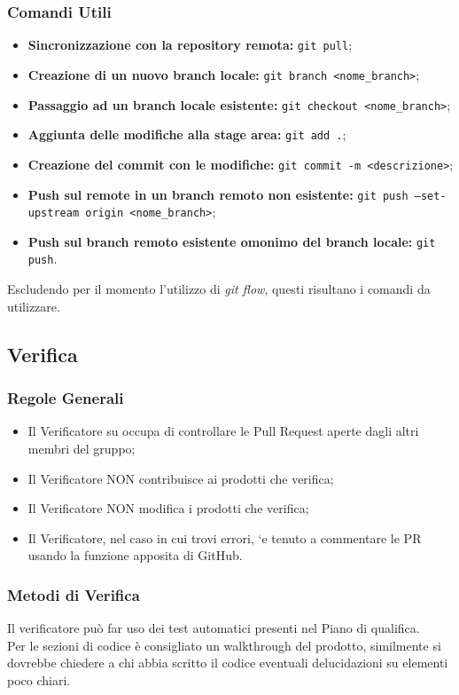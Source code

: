 \documentclass[a4paper, 12pt]{article}
\begin{document}
\subsubsection{Comandi Utili}
\begin{itemize}
    \item \textbf{Sincronizzazione con la repository remota:} \texttt{git pull};
    \item \textbf{Creazione di un nuovo branch locale:} \texttt{git branch <nome\_branch>};
    \item \textbf{Passaggio ad un branch locale esistente:} \texttt{git checkout <nome\_branch>};
    \item \textbf{Aggiunta delle modifiche alla stage area:} \texttt{git add .};
    \item \textbf{Creazione del commit con le modifiche:} \texttt{git commit -m <descrizione>};
    \item \textbf{Push sul remote in un branch remoto non esistente:} \texttt{git push --set-upstream origin <nome\_branch>};
    \item \textbf{Push sul branch remoto esistente omonimo del branch locale:} \texttt{git push}.
\end{itemize}
Escludendo per il momento l'utilizzo di \textit{git flow}, questi risultano i comandi da utilizzare.

\subsection{Verifica}
\subsubsection{Regole Generali}
\begin{itemize}
    \item Il Verificatore su occupa di controllare le Pull Request aperte dagli altri membri del gruppo;
    \item Il Verificatore NON contribuisce ai prodotti che verifica;
    \item Il Verificatore NON modifica i prodotti che verifica;
    \item Il Verificatore, nel caso in cui trovi errori, `e tenuto a commentare le PR usando la funzione apposita di GitHub.
\end{itemize}
\subsubsection{Metodi di Verifica}
Il verificatore può far uso dei test automatici presenti nel Piano di qualifica.\\
Per le sezioni di codice è consigliato un walkthrough del prodotto, similmente si dovrebbe chiedere a chi abbia scritto il codice eventuali delucidazioni su elementi poco chiari.
\end{document}
